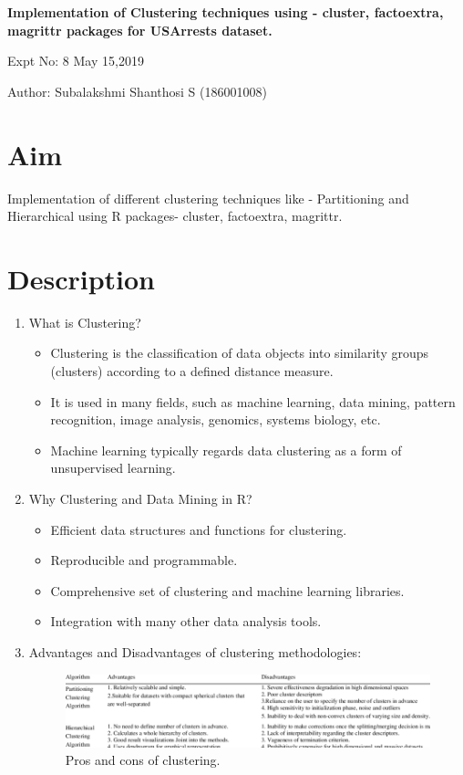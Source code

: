 \documentclass[a4paper,10pt]{article}
\begin{document}
\setcounter{secnumdepth}{-1} 
\begin{center}
\textbf{\LARGE  Implementation of Clustering techniques using - cluster, factoextra, magrittr packages for USArrests dataset.}
\end{center}

\raggedright Expt No: 8 \hfill \raggedleft May 15,2019 \\ 

\raggedright Author: Subalakshmi Shanthosi S (186001008) \par 

\noindent\makebox[\linewidth]{\rule{\textwidth}{1pt}} 

\section{Aim}
Implementation of different clustering techniques like - Partitioning and Hierarchical using R packages-	cluster, factoextra, magrittr.

\section{Description}
\begin{enumerate}
	\item What is Clustering?
	\begin{itemize}
		\item Clustering is the classification of data objects into similarity groups (clusters) according to a defined distance measure.
		\item It is used in many fields, such as machine learning, data mining, pattern recognition, image analysis, genomics, systems biology, etc.	 
		\item Machine learning typically regards data clustering as a form of unsupervised learning.
	\end{itemize}
 \item {Why Clustering and Data Mining in R?} 
	    \begin{itemize}
	    	\item Efficient data structures and functions for clustering.
	    	\item Reproducible and programmable.
	    	\item Comprehensive set of clustering and machine learning libraries.
	    	\item Integration with many other data analysis tools.	
	    \end{itemize}
    \item Advantages and Disadvantages of clustering methodologies:
    \begin{figure}[h]
    	\includegraphics[scale=0.60,center]{Expt8OP/advDisadvClustering.png}
    	\caption{Pros and cons of clustering.}
    	\label{fig:1}
    \end{figure}
\end{enumerate}
\end{document}
